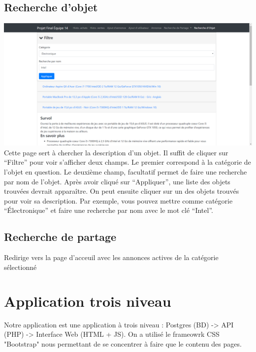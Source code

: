 \documentclass[a4paper,12pt]{article}
\begin{document}
\begin{spacing}{1}
    \subsection*{Recherche d'objet}
    \includegraphics[scale=0.4]{recherche_objet.png}
Cette page sert à chercher la description d'un objet. Il suffit de cliquer sur ``Filtre'' pour voir s'afficher deux champs. Le premier correspond à la catégorie de l'objet en question. Le deuxième champ, facultatif permet de faire une recherche par nom de l'objet. Après avoir cliqué sur ``Appliquer'', une liste des objets trouvées devrait apparaître. On peut ensuite cliquer sur un des objets trouvés pour voir sa description. 
Par exemple, vous pouvez mettre comme catégorie ``Électronique'' et faire une recherche par nom avec le mot clé ``Intel''.

    \subsection*{Recherche de partage}
    Redirige vers la page d'acceuil avec les annonces actives de la catégorie sélectionné

	\section*{Application trois niveau}
	Notre application est une application à trois niveau : Postgres (BD) -> API (PHP) -> Interface Web (HTML + JS). On a utilisé le frameowrk CSS "Bootstrap" nous permettant de se concentrer à faire que le contenu des pages.
	\end{spacing}                                                 
\end{document}
